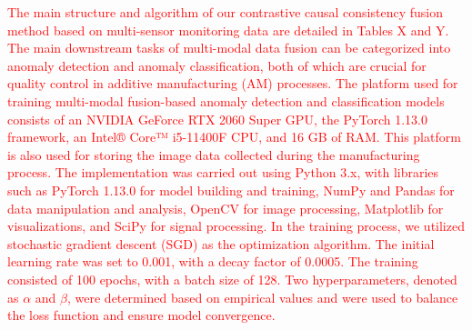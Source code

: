 \documentclass[preprint,12pt]{elsarticle}
\begin{document}
\textcolor{red}{The main structure and algorithm of our contrastive causal consistency fusion method based on multi-sensor monitoring data are detailed in Tables X and Y. The main downstream tasks of multi-modal data fusion can be categorized into anomaly detection and anomaly classification, both of which are crucial for quality control in additive manufacturing (AM) processes. The platform used for \textcolor{red}{training multi-modal fusion-based anomaly detection and classification models} consists of an NVIDIA GeForce RTX 2060 Super GPU, the PyTorch 1.13.0 framework, an Intel® Core™ i5-11400F CPU, and 16 GB of RAM. This platform is also used for storing the image data collected during the manufacturing process. The implementation was carried out using Python 3.x, with libraries such as PyTorch 1.13.0 for model building and training, NumPy and Pandas for data manipulation and analysis, OpenCV for image processing, Matplotlib for visualizations, and SciPy for signal processing. In the training process, we utilized stochastic gradient descent (SGD) as the optimization algorithm. The initial learning rate was set to 0.001, with a decay factor of 0.0005. The training consisted of 100 epochs, with a batch size of 128. Two hyperparameters, denoted as $\alpha$ and $\beta$, were determined based on empirical values and were used to balance the loss function and ensure model convergence.}
\end{document}
